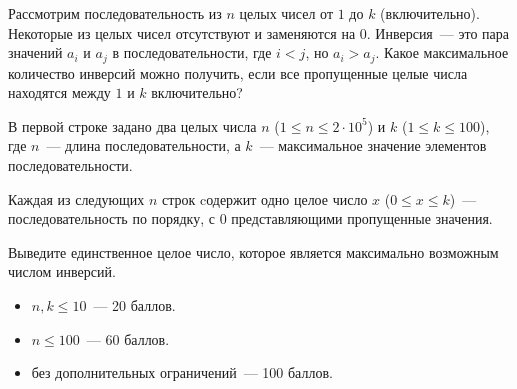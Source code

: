 
Рассмотрим последовательность из $n$ целых чисел от $1$ до $k$ (включительно). Некоторые из целых чисел отсутствуют и заменяются на $0$.
Инверсия~--- это пара значений $a_i$ и $a_j$ в последовательности, где $i < j$, но $a_i > a_j$. Какое максимальное количество
инверсий можно получить, если все пропущенные целые числа находятся между $1$ и $k$ включительно?

\Input
В первой строке задано два целых числа $n$ ($1 \le n \le 2 \cdot 10^5$) и $k$ ($1 \le k \le 100$), где $n$~---
длина последовательности, а $k$~--- максимальное значение элементов последовательности.

Каждая из следующих $n$ строк cодержит одно целое число $x$ ($0 \le x \le k$)~--- последовательность по порядку, с $0$
представляющими пропущенные значения.

\Output
Выведите единственное целое число, которое является максимально возможным числом инверсий.

\Samples
\BeginTests
\EndTests

\Scoring
\begin{itemize}
	\item $n, k \le 10$~--- 20 баллов.
	\item $n \le 100$~--- 60 баллов.
	\item без дополнительных ограничений~--- 100 баллов.
\end{itemize}

\EndProblem
